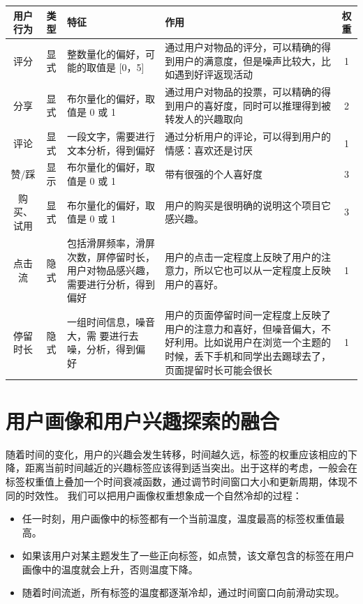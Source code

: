     \begin{table}[htp]
    \centering
    \label{tab:userAction}
    \begin{tabular}{ |c|c|p{4cm}|p{5cm}|c|} \hline
     用户行为 & 类型 & 特征 & 作用 & 权重\\ \hline
     评分 & 显式 & 整数量化的偏好，可能的取值是 [0，5] & 通过用户对物品的评分，可以精确的得到用户的满意度，但是噪声比较大，比如遇到好评返现活动 & 1\\ \hline
     分享 & 显式 & 布尔量化的偏好，取值是 0 或 1 & 通过用户对物品的投票，可以精确的得到用户的喜好度，同时可以推理得到被转发人的兴趣取向 & 2\\ \hline
     评论 & 显式 & 一段文字，需要进行文本分析，得到偏好 & 通过分析用户的评论，可以得到用户的情感：喜欢还是讨厌 & 1\\ \hline
     赞/踩 & 显示 & 布尔量化的偏好，取值是 0 或 1 & 带有很强的个人喜好度 & 3 \\ \hline
     购买、试用 & 显式 & 布尔量化的偏好，取值是 0 或 1 & 用户的购买是很明确的说明这个项目它感兴趣。& 3 \\ \hline
     点击流 & 隐式 & 包括滑屏频率，滑屏次数，屏停留时长，用户对物品感兴趣，需要进行分析，得到偏好 & 用户的点击一定程度上反映了用户的注意力，所以它也可以从一定程度上反映用户的喜好。& 1 \\ \hline
     停留时长 & 隐式 & 一组时间信息，噪音大，需 要进行去噪，分析，得到偏 好 & 用户的页面停留时间一定程度上反映了用户的注意力和喜好，但噪音偏大，不好利用。比如说用户在浏览一个主题的时候，丢下手机和同学出去踢球去了，页面提留时长可能会很长 & 1 \\ \hline
    \end{tabular}
    \end{table}

  \section{用户画像和用户兴趣探索的融合}
  随着时间的变化，用户的兴趣会发生转移，时间越久远，标签的权重应该相应的下降，距离当前时间越近的兴趣标签应该得到适当突出。出于这样的考虑，一般会在标签权重值上叠加一个时间衰减函数，通过调节时间窗口大小和更新周期，体现不同的时效性。
  我们可以把用户画像权重想象成一个自然冷却的过程：
  \begin{itemize}
    \item 任一时刻，用户画像中的标签都有一个当前温度，温度最高的标签权重值最高。
    \item 如果该用户对某主题发生了一些正向标签，如点赞，该文章包含的标签在用户画像中的温度就会上升，否则温度下降。
    \item 随着时间流逝，所有标签的温度都逐渐冷却，通过时间窗口向前滑动实现。
  \end{itemize}

